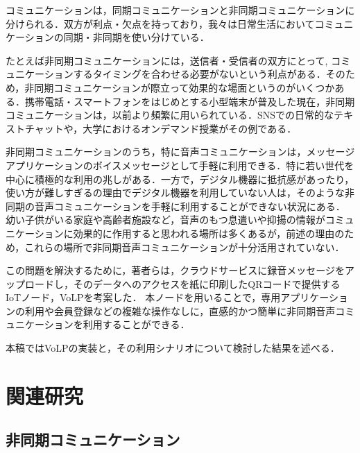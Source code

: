 \documentclass[submit,techrep,noauthor]{ipsj}
\begin{document}
コミュニケーションは，同期コミュニケーションと非同期コミュニケーションに分けられる．双方が利点・欠点を持っており，我々は日常生活においてコミュニケーションの同期・非同期を使い分けている．\par
たとえば非同期コミュニケーションには，送信者・受信者の双方にとって, コミュニケーションするタイミングを合わせる必要がないという利点がある．そのため，非同期コミュニケーションが際立って効果的な場面\cite{effective}というのがいくつかある．携帯電話・スマートフォンをはじめとする小型端末が普及した現在，非同期コミュニケーションは，以前より頻繁に用いられている．SNSでの日常的なテキストチャットや，大学におけるオンデマンド授業がその例である．\par
非同期コミュニケーションのうち，特に音声コミュニケーションは，メッセージアプリケーションのボイスメッセージとして手軽に利用できる．特に若い世代を中心に積極的な利用の兆しがある\cite{vox}．一方で，デジタル機器に抵抗感があったり，使い方が難しすぎるの理由でデジタル機器を利用していない人は，そのような非同期の音声コミュニケーションを手軽に利用することができない状況にある\cite{divide-1}\cite{divide-2}． 幼い子供がいる家庭や高齢者施設など，音声のもつ息遣いや抑揚の情報がコミュニケーションに効果的に作用すると思われる場所は多くあるが，前述の理由のため，これらの場所で非同期音声コミュニケーションが十分活用されていない．\par
この問題を解決するために，著者らは，クラウドサービスに録音メッセージをアップロードし，そのデータへのアクセスを紙に印刷したQRコードで提供するIoTノード，VoLPを考案した．
本ノードを用いることで，専用アプリケーションの利用や会員登録などの複雑な操作なしに，直感的かつ簡単に非同期音声コミュニケーションを利用することができる．\par
本稿ではVoLPの実装と，その利用シナリオについて検討した結果を述べる．

\section{関連研究}
\label{sec:related-research}


\subsection{非同期コミュニケーション}
\end{document}
